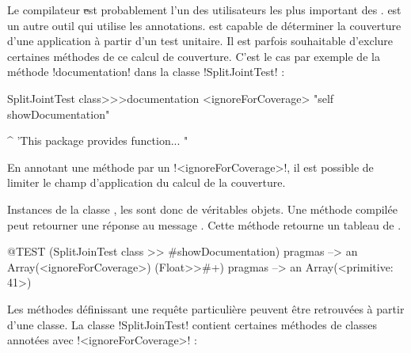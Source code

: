 \documentclass[a4paper,10pt,twoside]{book}
\begin{document}
{Le compilateur \st est probablement l'un des utilisateurs les plus important des \pragmas. \sunit est un autre outil qui utilise les annotations. \sunit est capable de déterminer la couverture d'une application à partir d'un test unitaire. Il est parfois souhaitable d'exclure certaines méthodes de ce calcul de couverture. C'est le cas par exemple de la méthode \ct!documentation! dans la classe \ct!SplitJointTest! :

\begin{code}{}
SplitJointTest class>>>documentation
	<ignoreForCoverage>
	"self showDocumentation"
	
	^ 'This package provides function... "
\end{code}

En annotant une méthode par un \pragma \ct!<ignoreForCoverage>!, il est possible de limiter le champ d'application du calcul de la couverture.


%	


Instances de la classe , les \pragmas sont donc de véritables objets. Une méthode compilée peut retourner une réponse au message . Cette méthode retourne un tableau de \pragmas.

\begin{code}{@TEST}
(SplitJoinTest class >> #showDocumentation) pragmas
  --> an Array(<ignoreForCoverage>)
(Float>>#+) pragmas --> an Array(<primitive: 41>)
\end{code}

Les méthodes définissant une requête particulière peuvent être retrouvées à partir d'une classe. La classe \ct!SplitJoinTest! contient certaines méthodes de classes annotées avec \ct!<ignoreForCoverage>! :

}
\end{document}
